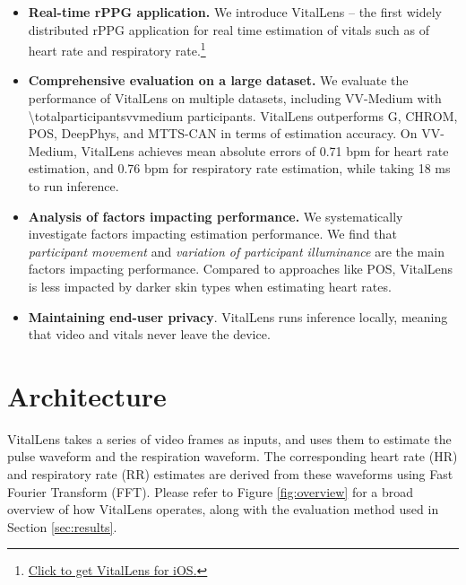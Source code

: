 \documentclass{article}
\begin{document}
\begin{itemize}
	\item \textbf{Real-time rPPG application.} We introduce VitalLens -- the first widely distributed rPPG application for real time estimation of vitals such as of heart rate and respiratory rate.\footnote{\href{https://apps.apple.com/us/app/vitallens/id6472757649}{Click to get VitalLens for iOS.}} 
	\item \textbf{Comprehensive evaluation on a large dataset.} We evaluate the performance of VitalLens on multiple datasets, including VV-Medium \cite{toye2023vital} with \num{\totalparticipantsvvmedium} participants. VitalLens outperforms G, CHROM, POS, DeepPhys, and MTTS-CAN in terms of estimation accuracy. On VV-Medium, VitalLens achieves mean absolute errors of 0.71 bpm for heart rate estimation, and 0.76 bpm for respiratory rate estimation, while taking 18 ms to run inference.
	\item \textbf{Analysis of factors impacting performance.} We systematically investigate factors impacting estimation performance. We find that \textit{participant movement} and \textit{variation of participant illuminance} are the main factors impacting performance. Compared to approaches like POS, VitalLens is less impacted by darker skin types when estimating heart rates. 
	\item \textbf{Maintaining end-user privacy}. VitalLens runs inference locally, meaning that video and vitals never leave the device.
\end{itemize}

\section{Architecture}
\label{sec:architecture}

VitalLens takes a series of video frames as inputs, and uses them to estimate the pulse waveform and the respiration waveform.
The corresponding heart rate (HR) and respiratory rate (RR) estimates are derived from these waveforms using Fast Fourier Transform (FFT).
Please refer to Figure \ref{fig:overview} for a broad overview of how VitalLens operates, along with the evaluation method used in Section \ref{sec:results}.
\end{document}
